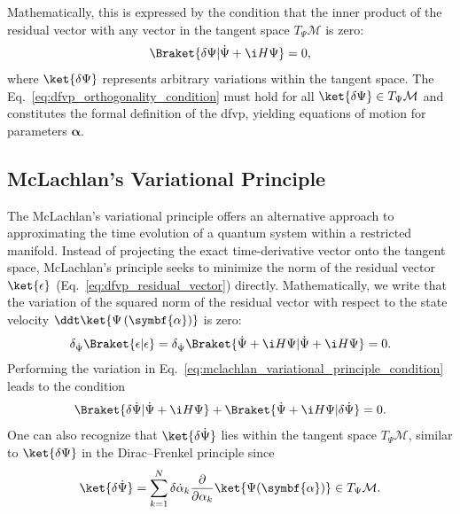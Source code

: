 Mathematically, this is expressed by the condition that the inner product of the residual vector with any vector in the tangent space $T_{\Psi}\mathcal{M}$ is zero:
\begin{equation}\label{eq:dfvp_orthogonality_condition}
\Braket{\delta\Psi|\dot\Psi+\i H\Psi}=0,
\end{equation}
where $\ket{\delta\Psi}$ represents arbitrary variations within the tangent space. The Eq.~\eqref{eq:dfvp_orthogonality_condition} must hold for all $\ket{\delta\Psi}\in T_{\Psi}\mathcal{M}$ and constitutes the formal definition of the \acrshort{dfvp}, yielding equations of motion for parameters $\symbf{\alpha}$.
\subsection{McLachlan's Variational Principle}\label{sec:mclachlan_variational_principle}
The McLachlan's variational principle offers an alternative approach to approximating the time evolution of a quantum system within a restricted manifold. Instead of projecting the exact time-derivative vector onto the tangent space, McLachlan's principle seeks to minimize the norm of the residual vector $\ket{\epsilon}$ (Eq.~\eqref{eq:dfvp_residual_vector}) directly.\supercite{10.1080/00268976400100041} Mathematically, we write that the variation of the squared norm of the residual vector with respect to the state velocity $\ddt\ket{\Psi\left(\symbf{\alpha}\right)}$ is zero:
\begin{equation}\label{eq:mclachlan_variational_principle_condition}
\delta_{\dot\Psi}\Braket{\epsilon|\epsilon}=\delta_{\dot\Psi}\Braket{\dot\Psi+\i H\Psi|\dot\Psi+\i H\Psi}=0.
\end{equation}
Performing the variation in Eq.~\eqref{eq:mclachlan_variational_principle_condition} leads to the condition
\begin{equation}\label{eq:mclachlan_variational_principle_intermediate}
\Braket{\delta\dot\Psi|\dot\Psi+\i H\Psi}+\Braket{\dot\Psi+\i H\Psi|\delta\dot\Psi}=0.
\end{equation}
One can also recognize that $\ket{\delta\dot\Psi}$ lies within the tangent space $T_{\Psi}\mathcal{M}$, similar to $\ket{\delta\Psi}$ in the Dirac--Frenkel principle since
\begin{equation}\label{eq:tangent_variation_equality}
\ket{\delta\dot\Psi}=\sum_{k=1}^N\delta\dot{\alpha}_k\frac{\partial}{\partial\alpha_k}\ket{\Psi(\symbf{\alpha})}\in T_{\Psi}\mathcal{M}.
\end{equation}
